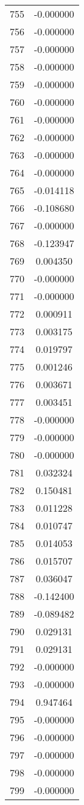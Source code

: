 \documentclass[12pt]{article}
\begin{document}
\begin{longtable}{@{}cc@{}}
755 & -0.000000 \\
756 & -0.000000 \\
757 & -0.000000 \\
758 & -0.000000 \\
759 & -0.000000 \\
760 & -0.000000 \\
761 & -0.000000 \\
762 & -0.000000 \\
763 & -0.000000 \\
764 & -0.000000 \\
765 & -0.014118 \\
766 & -0.108680 \\
767 & -0.000000 \\
768 & -0.123947 \\
769 & 0.004350 \\
770 & -0.000000 \\
771 & -0.000000 \\
772 & 0.000911 \\
773 & 0.003175 \\
774 & 0.019797 \\
775 & 0.001246 \\
776 & 0.003671 \\
777 & 0.003451 \\
778 & -0.000000 \\
779 & -0.000000 \\
780 & -0.000000 \\
781 & 0.032324 \\
782 & 0.150481 \\
783 & 0.011228 \\
784 & 0.010747 \\
785 & 0.014053 \\
786 & 0.015707 \\
787 & 0.036047 \\
788 & -0.142400 \\
789 & -0.089482 \\
790 & 0.029131 \\
791 & 0.029131 \\
792 & -0.000000 \\
793 & -0.000000 \\
794 & 0.947464 \\
795 & -0.000000 \\
796 & -0.000000 \\
797 & -0.000000 \\
798 & -0.000000 \\
799 & -0.000000 \\

\end{longtable}
\end{document}
